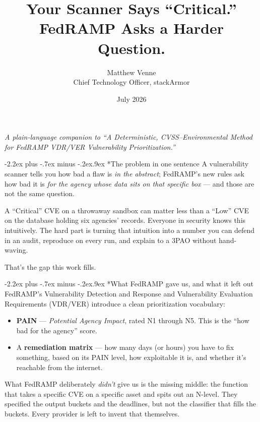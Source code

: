 \documentclass[11pt]{article}
\title{\bfseries Your Scanner Says ``Critical.''\\ FedRAMP Asks a Harder Question.}
\author{Matthew Venne \\ \small Chief Technology Officer, stackArmor}
\date{July 2026}
\makeatletter
\renewcommand\section{\@startsection{section}{1}{\z@}%
  {-2.2ex plus -.7ex minus -.2ex}{.9ex}%
  {\normalfont\Large\bfseries}}
\makeatother
\begin{document}
\maketitle

\begin{center}
\itshape A plain-language companion to ``A Deterministic, CVSS--Environmental
Method for FedRAMP VDR/VER Vulnerability Prioritization.''
\end{center}

\bigskip

\section*{The problem in one sentence}
A vulnerability scanner tells you how bad a flaw is \emph{in the abstract};
FedRAMP's new rules ask how bad it is \emph{for the agency whose data sits on that
specific box} --- and those are not the same question.

A ``Critical'' CVE on a throwaway sandbox can matter less than a ``Low'' CVE on the
database holding six agencies' records. Everyone in security knows this
intuitively. The hard part is turning that intuition into a number you can defend
in an audit, reproduce on every run, and explain to a 3PAO without hand-waving.

That's the gap this work fills.

\section*{What FedRAMP gave us, and what it left out}
FedRAMP's Vulnerability Detection and Response and Vulnerability Evaluation
Requirements (VDR/VER) introduce a clean prioritization vocabulary:
\begin{itemize}[leftmargin=1.5em]
\item \textbf{PAIN} --- \emph{Potential Agency Impact}, rated N1 through N5. This
  is the ``how bad for the agency'' score.
\item A \textbf{remediation matrix} --- how many days (or hours) you have to fix
  something, based on its PAIN level, how exploitable it is, and whether it's
  reachable from the internet.
\end{itemize}

What FedRAMP deliberately \emph{didn't} give us is the missing middle: the function
that takes a specific CVE on a specific asset and spits out an N-level. They
specified the output buckets and the deadlines, but not the classifier that fills
the buckets. Every provider is left to invent that themselves.
\end{document}
